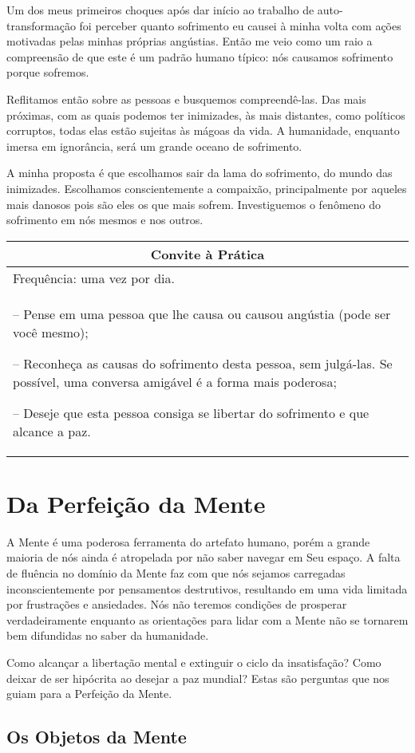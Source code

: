 \documentclass[oneside, 12pt]{book}
\newenvironment{prat}[1]
{\begin{center}
\begin{tabular}{p{0.9\textwidth}}
\hline\hline
\multicolumn{1}{c}{Convite à Prática}\\
\hline
Frequência: #1.\\
\hline
}{\\
\hline\hline
\end{tabular} 
\end{center}}
\begin{document}
Um dos meus primeiros choques após dar início ao trabalho de auto-transformação foi perceber quanto sofrimento eu causei à minha volta com ações motivadas pelas minhas próprias angústias. Então me veio como um raio a compreensão de que este é um padrão humano típico: nós causamos sofrimento porque sofremos.

Reflitamos então sobre as pessoas e busquemos compreendê-las. Das mais próximas, com as quais podemos ter inimizades, às mais distantes, como políticos corruptos, todas elas estão sujeitas às mágoas da vida. A humanidade, enquanto imersa em ignorância, será um grande oceano de sofrimento.

A minha proposta é que escolhamos sair da lama do sofrimento, do mundo das inimizades. Escolhamos conscientemente a compaixão, principalmente por aqueles mais danosos pois são eles os que mais sofrem. Investiguemos o fenômeno do sofrimento em nós mesmos e nos outros.

\begin{prat}{uma vez por dia}
-- Pense em uma pessoa que lhe causa ou causou angústia (pode ser você mesmo);

-- Reconheça as causas do sofrimento desta pessoa, sem julgá-las. Se possível, uma conversa amigável é a forma mais poderosa;

-- Deseje que esta pessoa consiga se libertar do sofrimento e que alcance a paz.
\end{prat}

\chapter*{Da Perfeição da Mente}

A Mente é uma poderosa ferramenta do artefato humano, porém a grande maioria de nós ainda é atropelada por não saber navegar em Seu espaço. A falta de fluência no domínio da Mente faz com que nós sejamos carregadas inconscientemente por pensamentos destrutivos, resultando em uma vida limitada por frustrações e ansiedades. Nós não teremos condições de prosperar verdadeiramente enquanto as orientações para lidar com a Mente não se tornarem bem difundidas no saber da humanidade.

Como alcançar a libertação mental e extinguir o ciclo da insatisfação? Como deixar de ser hipócrita ao desejar a paz mundial? Estas são perguntas que nos guiam para a Perfeição da Mente.

\section*{Os Objetos da Mente}
\end{document}

